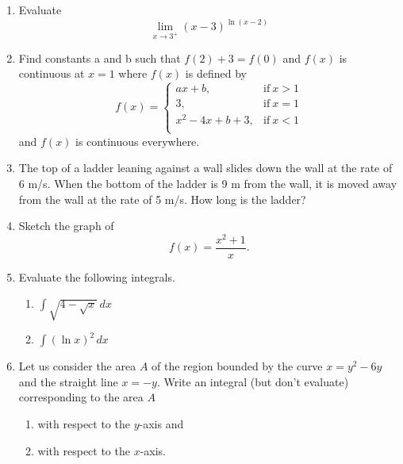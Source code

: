\documentclass[a4paper, 12pt]{article}
\begin{document}
\begin{enumerate}[leftmargin=*,label=\textbf{\arabic*.}]
\item Evaluate
\[\lim_{x\to3^+}(x-3)^{\ln(x-2)}\]

\item Find constants a and b such that $f(2) + 3 = f(0)$ and $f(x)$ is continuous at $x=1$ where $f(x)$ is defined by
\[
f(x) =
\begin{cases}
ax + b, & \text{if}\ x > 1 \\
3, & \text{if}\ x = 1 \\
x^2-4x+b+3, & \text{if}\ x < 1 \\
\end{cases}
\]
and $f(x)$ is continuous everywhere.

\item The top of a ladder leaning against a wall slides down the wall at the rate of 6 m/s. When the bottom of the ladder is 9 m from the wall, it is moved away from the wall at the rate of 5 m/s. How long is the ladder?

\item Sketch the graph of
\[f(x) = \frac{x^2+1}{x}.\]

\item Evaluate the following integrals.

\begin{enumerate}[leftmargin=*,label=\textbf{\alph*.}]

\item $\displaystyle \int\sqrt{4-\sqrt{x}}\, dx$

\item $\displaystyle \int(\ln x)^2\, dx$

\end{enumerate}

\item Let us consider the area $A$ of the region bounded by the curve $x=y^2-6y$ and the straight line $x=-y$. Write an integral (but don't evaluate) corresponding to the area $A$
\begin{enumerate}[leftmargin=*,label=\textbf{\alph*.}]
\item with respect to the $y$-axis and
\item with respect to the $x$-axis.
\end{enumerate}
\end{enumerate}

\newpage
{}
{}
\end{document}
